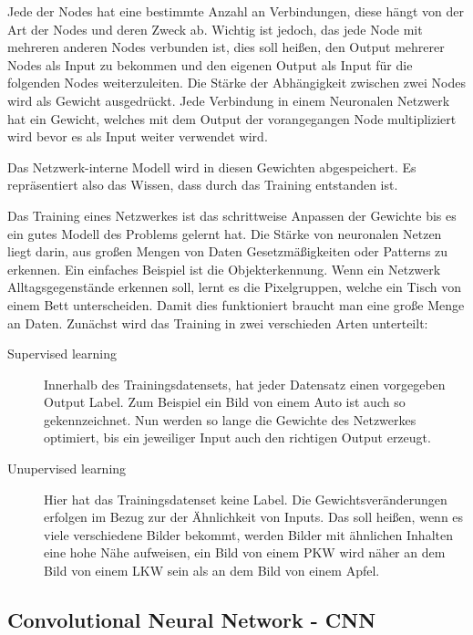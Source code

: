 \documentclass[pdftex,a4paper,halfparskip, article]{scrartcl}
\begin{document}
Jede der Nodes hat eine bestimmte Anzahl an Verbindungen, diese hängt von der Art der Nodes und deren Zweck ab. Wichtig ist jedoch, das jede Node mit mehreren anderen Nodes verbunden ist, dies soll heißen, den Output mehrerer Nodes als Input zu bekommen und den eigenen Output als Input für die folgenden Nodes weiterzuleiten. Die Stärke der Abhängigkeit zwischen zwei Nodes wird als Gewicht ausgedrückt. Jede Verbindung in einem Neuronalen Netzwerk hat ein Gewicht, welches mit dem Output der vorangegangen Node multipliziert wird bevor es als Input weiter verwendet wird.

Das Netzwerk-interne Modell wird in diesen Gewichten abgespeichert. Es repräsentiert also das Wissen, dass durch das Training entstanden ist.

Das Training eines Netzwerkes ist das schrittweise Anpassen der Gewichte bis es ein gutes Modell des Problems gelernt hat. Die Stärke von neuronalen Netzen liegt darin, aus großen Mengen von Daten Gesetzmäßigkeiten oder Patterns zu erkennen. Ein einfaches Beispiel ist die Objekterkennung. Wenn ein Netzwerk Alltagsgegenstände erkennen soll, lernt es die Pixelgruppen, welche ein Tisch von einem Bett unterscheiden. Damit dies funktioniert braucht man eine große Menge an Daten. Zunächst wird das Training in zwei verschieden Arten unterteilt: 

\begin{description}
	\item[Supervised learning] Innerhalb des Trainingsdatensets, hat jeder Datensatz einen vorgegeben Output Label. Zum Beispiel ein Bild von einem Auto ist auch so gekennzeichnet. Nun werden so lange die Gewichte des Netzwerkes optimiert, bis ein jeweiliger Input auch den richtigen Output erzeugt.
	\item[Unupervised learning] Hier hat das Trainingsdatenset keine Label. Die Gewichtsveränderungen erfolgen im Bezug zur der Ähnlichkeit von Inputs. Das soll heißen, wenn es viele verschiedene Bilder bekommt, werden Bilder mit ähnlichen Inhalten eine hohe Nähe aufweisen, ein Bild von einem PKW wird näher an dem Bild von einem LKW sein als an dem Bild von einem Apfel.
\end{description}

\subsection{Convolutional Neural Network - CNN}
\end{document}
